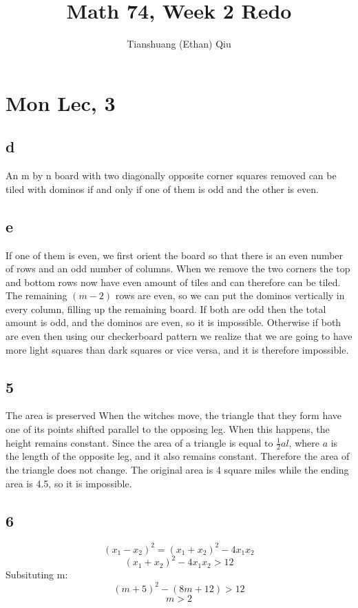 \documentclass[12pt]{article}
\author{Tianshuang (Ethan) Qiu}
\begin{document}
\title{Math 74, Week 2 Redo}
\maketitle

\section{Mon Lec, 3}
\subsection{d}
An m by n board with two diagonally opposite corner squares removed can be tiled with dominos if and only if one of them is odd and the other is even.

\subsection{e}
If one of them is even, we first orient the board so that there is an even number of rows and an odd number of columns. When we remove the two corners the top and bottom rows now have even amount of tiles and can therefore can be tiled. The remaining $(m-2)$ rows are even, so we can put the dominos vertically in every column, filling up the remaining board.
\newline
If both are odd then the total amount is odd, and the dominos are even, so it is impossible. Otherwise if both are even then using our checkerboard pattern we realize that we are going to have more light squares than dark squares or vice versa, and it is therefore impossible.


\subsection{5}
The area is preserved
\newline
When the witches move, the triangle that they form have one of its points shifted parallel to the opposing leg. When this happens, the height remains constant. Since the area of a triangle is equal to $\frac{1}{2}al$, where $a$ is the length of the opposite leg, and it also remains constant. Therefore the area of the triangle does not change.
\newline
The original area is 4 square miles while the ending area is 4.5, so it is impossible.

\subsection{6}
$$(x_1-x_2)^2 = (x_1+x_2)^2 - 4x_1x_2$$
$$(x_1+x_2)^2 - 4x_1x_2 > 12$$
Subsituting m:
$$(m+5)^2-(8m+12)>12$$
$$m>2$$
\end{document}
